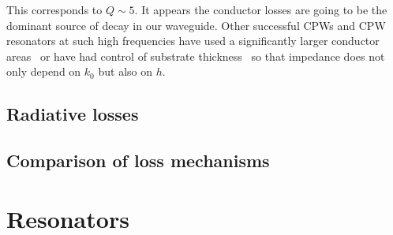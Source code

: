 \documentclass[a4paper]{article}
\begin{document}
This corresponds to $Q\sim5$. It appears the conductor losses are going
to be the dominant source of decay in our waveguide. Other successful CPWs and
CPW resonators at such high frequencies have used a significantly larger
conductor areas~\cite{1127105, doi:10.1063/1.3010859} or have had control of
substrate thickness~\cite{L.Cao2013} so that impedance does not only depend on
$k_0$ but also on $h$.

\subsection{Radiative losses}

\subsection{Comparison of loss mechanisms}

\section{Resonators}




\end{document}
